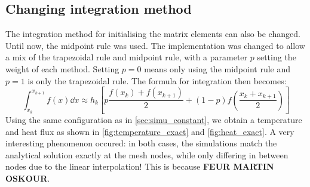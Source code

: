 \subsection{Changing integration method}

The integration method for initialising the matrix elements can also be changed. Until now, the midpoint rule was used. The implementation was changed to allow a mix of the trapezoidal rule and midpoint rule, with a parameter \(p\) setting the weight of each method. Setting \(p = 0\) means only using the midpoint rule and \(p = 1\) is only the trapezoidal rule. The formula for integration then becomes:
\begin{equation}
    \int_{x_k}^{x_{k+1}} f(x) \dd x \approx h_k \left[ p \frac{f(x_k) + f(x_{k+1})}{2} + (1-p) f \left( \frac{x_k + x_{k+1}}{2} \right) \right]
\end{equation}
Using the same configuration as in \autoref{sec:simu_constant}, we obtain a temperature and heat flux as shown in \autoref{fig:temperature_exact} and \autoref{fig:heat_exact}. A very interesting phenomenon occured: in both cases, the simulations match the analytical solution exactly at the mesh nodes, while only differing in between nodes due to the linear interpolation! This is because \textbf{FEUR MARTIN OSKOUR}.

